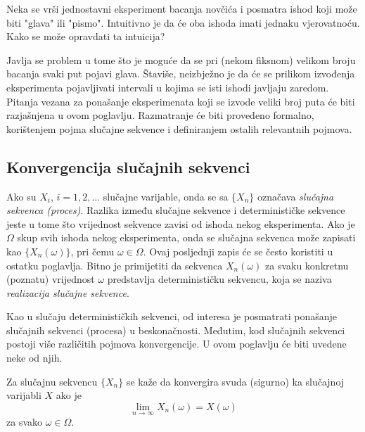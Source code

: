 Neka se vrši jednostavni eksperiment bacanja novčića i posmatra ishod koji može
biti "glava" ili "pismo". Intuitivno je da će oba ishoda imati jednaku
vjerovatnoću. Kako se može opravdati ta intuicija?

Javlja se problem u tome što je moguće da se pri (nekom fiksnom) velikom broju
bacanja svaki put pojavi glava. Štaviše, neizbježno je da će se prilikom
izvođenja eksperimenta pojavljivati intervali u kojima se isti ishodi javljaju
zaredom. Pitanja vezana za ponašanje eksperimenata koji se izvode veliki
broj puta će biti razjašnjena u ovom poglavlju. Razmatranje će biti provedeno
formalno, korištenjem pojma slučajne sekvence i definiranjem ostalih relevantnih
pojmova.

\subsection{Konvergencija slučajnih sekvenci}

Ako su $X_i$, $i=1,2,...$ slučajne varijable, onda se sa $\{X_n\}$ označava
\textit{slučajna sekvenca (proces)}. Razlika između slučajne sekvence i
determinističke sekvence jeste u tome što vrijednost sekvence zavisi od ishoda
nekog eksperimenta.  Ako je $\Omega$ skup svih ishoda nekog eksperimenta, onda
se slučajna sekvenca može zapisati kao $\{X_n(\omega)\}$, pri čemu $\omega \in
\Omega$. Ovaj posljednji zapis će se često koristiti u ostatku poglavlja. Bitno
je primijetiti da sekvenca $X_n(\omega)$ za svaku konkretnu (poznatu) vrijednost
$\omega$ predstavlja determinističku sekvencu, koja se naziva
\textit{realizacija slučajne sekvence}.

Kao u slučaju determinističkih sekvenci, od interesa je posmatrati ponašanje
slučajnih sekvenci (procesa) u beskonačnosti. Međutim, kod slučajnih sekvenci
postoji više različitih pojmova konvergencije. U ovom poglavlju će biti uvedene
neke od njih. 

\begin{definition}
  Za slučajnu sekvencu $\{X_n\}$ se kaže da konvergira svuda (sigurno) ka
  slučajnoj varijabli $X$ ako je
  \begin{equation}
    \lim_{n\to\infty} X_n(\omega) = X(\omega)
  \end{equation}
  za svako $\omega \in \Omega$.
\end{definition}


